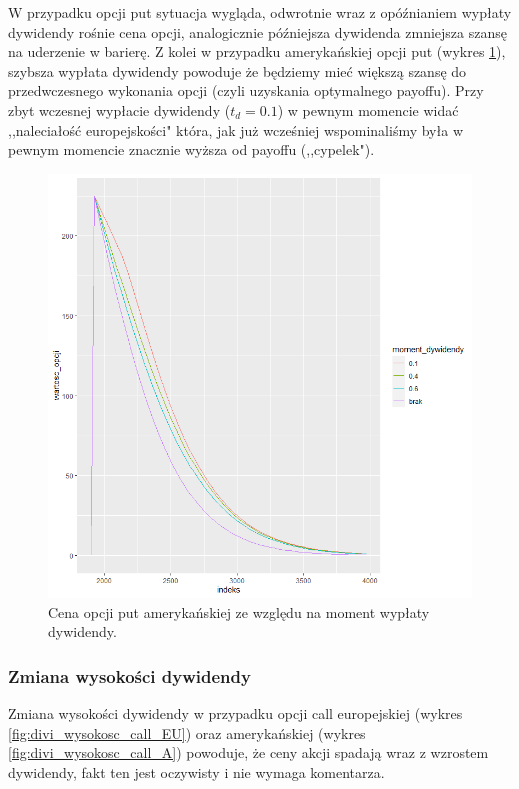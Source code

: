 \documentclass[12pt]{article}
\begin{document}
W przypadku opcji put sytuacja wygląda, odwrotnie wraz z opóźnianiem wypłaty dywidendy rośnie cena opcji, analogicznie późniejsza dywidenda zmniejsza szansę na uderzenie w barierę. Z kolei w przypadku amerykańskiej opcji put (wykres \ref{fig:moment_put_A}), szybsza wypłata dywidendy powoduje że będziemy mieć większą szansę do przedwczesnego wykonania opcji (czyli uzyskania optymalnego payoffu). Przy zbyt wczesnej wypłacie dywidendy ($t_d = 0.1$) w pewnym momencie widać ,,naleciałość europejskości" która, jak już wcześniej wspominaliśmy była w pewnym momencie znacznie wyższa od payoffu (,,cypelek").




\begin{figure}[H]
    \centering
    \includegraphics[width=\textwidth,height=\textheight,keepaspectratio]{dividend/put_A_procent_moment_dywidendy.png}
    \caption{Cena opcji put amerykańskiej ze względu na moment wypłaty dywidendy.}
    \label{fig:moment_put_A}
\end{figure}



\subsubsection{Zmiana wysokości dywidendy}

Zmiana wysokości dywidendy w przypadku opcji call europejskiej (wykres \ref{fig:divi_wysokosc_call_EU}) oraz amerykańskiej (wykres \ref{fig:divi_wysokosc_call_A}) powoduje, że ceny akcji spadają wraz z wzrostem dywidendy, fakt ten jest oczywisty i nie wymaga komentarza.
\end{document}
